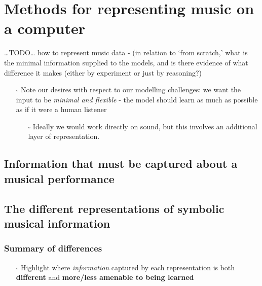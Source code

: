 \documentclass[12pt,a4paper,]{report}
\providecommand{\tightlist}{%
  \setlength{\itemsep}{0pt}\setlength{\parskip}{0pt}}
\begin{document}
\hypertarget{methods-for-representing-music-on-a-computer}{%
\section{Methods for representing music on a
computer}\label{methods-for-representing-music-on-a-computer}}

\ldots TODO\ldots{} how to represent music data - (in relation to `from
scratch,' what is the minimal information supplied to the models, and is
there evidence of what difference it makes (either by experiment or just
by reasoning?)

\begin{itemize}
\tightlist
\item[$\square$]
  Note our desires with respect to our modelling challenges: we want the
  input to be \emph{minimal and flexible} - the model should learn as
  much as possible as if it were a human listener

  \begin{itemize}
  \tightlist
  \item[$\square$]
    Ideally we would work directly on sound, but this involves an
    additional layer of representation.
  \end{itemize}
\end{itemize}

\hypertarget{information-that-must-be-captured-about-a-musical-performance}{%
\subsection{Information that must be captured about a musical
performance}\label{information-that-must-be-captured-about-a-musical-performance}}

\hypertarget{the-different-representations-of-symbolic-musical-information}{%
\subsection{The different representations of symbolic musical
information}\label{the-different-representations-of-symbolic-musical-information}}

\hypertarget{summary-of-differences}{%
\subsubsection{Summary of differences}\label{summary-of-differences}}

\begin{itemize}
\tightlist
\item[$\square$]
  Highlight where \emph{information} captured by each representation is
  both \textbf{different} and \textbf{more/less amenable to being
  learned}
\end{itemize}
\end{document}
